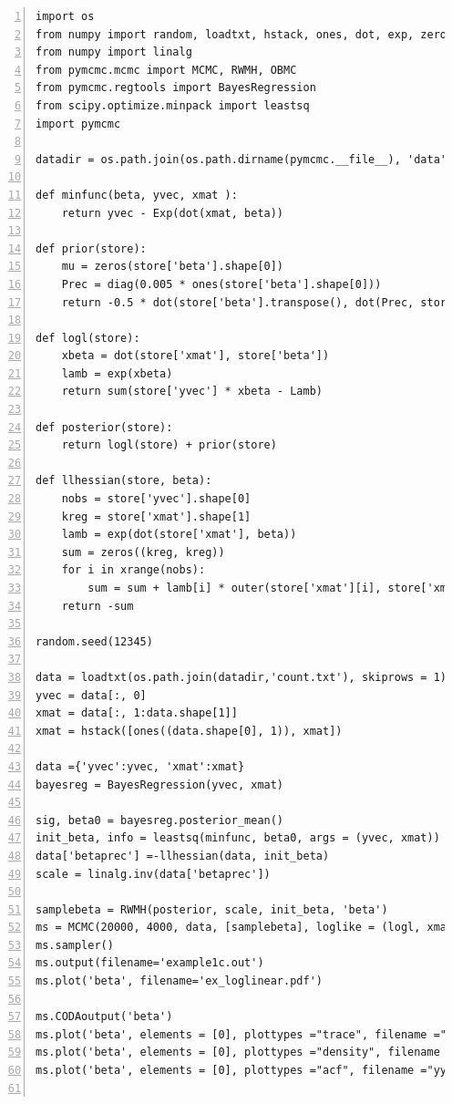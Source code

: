 \documentclass[article]{jss}
\begin{document}
\begin{lstlisting}[basicstyle={\scriptsize},numbers=left]
import os
from numpy import random, loadtxt, hstack, ones, dot, exp, zeros, outer, diag
from numpy import linalg
from pymcmc.mcmc import MCMC, RWMH, OBMC
from pymcmc.regtools import BayesRegression
from scipy.optimize.minpack import leastsq
import pymcmc

datadir = os.path.join(os.path.dirname(pymcmc.__file__), 'data')

def minfunc(beta, yvec, xmat ):
    return yvec - Exp(dot(xmat, beta))

def prior(store):
    mu = zeros(store['beta'].shape[0])
    Prec = diag(0.005 * ones(store['beta'].shape[0]))
    return -0.5 * dot(store['beta'].transpose(), dot(Prec, store['beta']))

def logl(store):
    xbeta = dot(store['xmat'], store['beta'])
    lamb = exp(xbeta)
    return sum(store['yvec'] * xbeta - Lamb)

def posterior(store):
    return logl(store) + prior(store)

def llhessian(store, beta):
    nobs = store['yvec'].shape[0]
    kreg = store['xmat'].shape[1]
    lamb = exp(dot(store['xmat'], beta))
    sum = zeros((kreg, kreg))
    for i in xrange(nobs):
        sum = sum + lamb[i] * outer(store['xmat'][i], store['xmat'][i])
    return -sum

random.seed(12345)      

data = loadtxt(os.path.join(datadir,'count.txt'), skiprows = 1)
yvec = data[:, 0]
xmat = data[:, 1:data.shape[1]]
xmat = hstack([ones((data.shape[0], 1)), xmat])

data ={'yvec':yvec, 'xmat':xmat} 
bayesreg = BayesRegression(yvec, xmat)     

sig, beta0 = bayesreg.posterior_mean()
init_beta, info = leastsq(minfunc, beta0, args = (yvec, xmat))
data['betaprec'] =-llhessian(data, init_beta)
scale = linalg.inv(data['betaprec'])

samplebeta = RWMH(posterior, scale, init_beta, 'beta')
ms = MCMC(20000, 4000, data, [samplebeta], loglike = (logl, xmat.shape[1], 'yvec'))
ms.sampler()
ms.output(filename='example1c.out') 
ms.plot('beta', filename='ex_loglinear.pdf')

ms.CODAoutput('beta')
ms.plot('beta', elements = [0], plottypes ="trace", filename ="xx.pdf")
ms.plot('beta', elements = [0], plottypes ="density", filename ="xx.png")
ms.plot('beta', elements = [0], plottypes ="acf", filename ="yy.ps")


\end{lstlisting}
\end{document}

